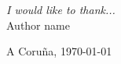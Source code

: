 
{\it
I would like to thank...
}
\\ 

\normalfont
\vspace{1cm}
\hfill{Author name}

\hfill{A Coruña, \today}